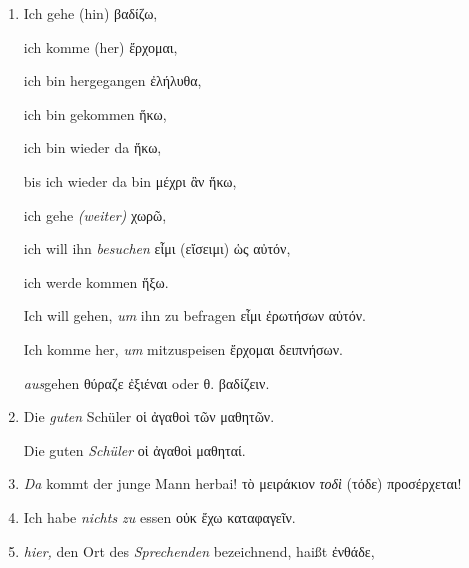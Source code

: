 \begin{enumerate}[leftmargin=0pt,rightmargin=0pt,listparindent =1cm,labelindent=1cm,labelsep=1ex,labelwidth={*},itemindent={*},align=left]
\begin{continuousitemline}
Ich will dich mit (zu ihm) nehmen \textgreek[variant=ancient]{ἄξω
σε παρ᾽ αυτόν.}\par\end{continuousitemline}

\item Ich gehe (hin) \textgreek[variant=ancient]{βαδίζω,}


\begin{continuousitemline}ich komme (her) \textgreek[variant=ancient]{ἔρχομαι,}


ich bin hergegangen \textgreek[variant=ancient]{ἐλήλυθα,}


ich bin gekommen \textgreek[variant=ancient]{ἥκω,}


ich bin wieder da \textgreek[variant=ancient]{ἥκω,}


bis ich wieder da bin \textgreek[variant=ancient]{μέχρι ἃν ἥκω,}


ich gehe \emph{(weiter)} \textgreek[variant=ancient]{χωρῶ,}


ich will ihn \emph{besuchen} \textgreek[variant=ancient]{εἶμι (εἴσειμι)
ὡς αὐτόν,}


ich werde kommen \textgreek[variant=ancient]{ἥξω.}


Ich will gehen, \emph{um} ihn zu befragen \textgreek[variant=ancient]{εἶμι
ἐρωτήσων αὐτόν.}


Ich komme her, \emph{um} mit\textcompwordmark{}zuspeisen \textgreek[variant=ancient]{ἔρχομαι
δειπνήσων.}


\emph{aus}gehen \textgreek[variant=ancient]{θύραζε ἐξιέναι} oder
\textgreek[variant=ancient]{θ. βαδίζειν.}\par\end{continuousitemline}

\item Die \emph{guten} Schüler \textgreek[variant=ancient]{οἱ ἀγαθοὶ τῶν
μαθητῶν.}


\begin{continuousitemline}Die guten \emph{Schüler} \textgreek[variant=ancient]{οἱ
ἀγαθοὶ μαθηταί.}\par\end{continuousitemline}

\item \emph{Da} kommt der junge Mann herbai! \textgreek[variant=ancient]{τὸ
μειράκιον \emph{τοδὶ} (τόδε) προσέρχεται!} 
\item Ich habe \emph{nichts zu} essen \textgreek[variant=ancient]{οὐκ ἔχω
καταφαγεῖν.}
\item \emph{hier,} den Ort des \emph{Sprechenden} bezeichnend, haißt \textgreek[variant=ancient]{ἐνθάδε,}



\end{enumerate}

